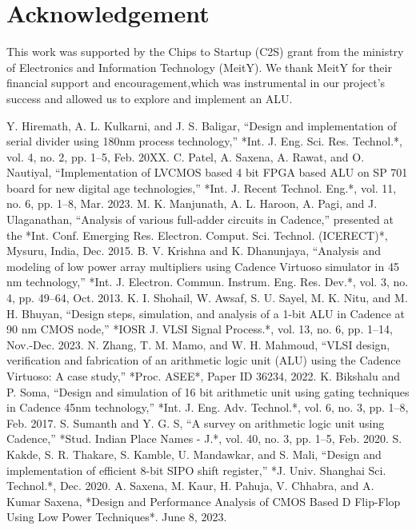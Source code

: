 \documentclass[conference]{IEEEtran}
\begin{document}
\section*{Acknowledgement}
This work was supported by the Chips to Startup (C2S) grant from the ministry of Electronics and Information Technology (MeitY). We thank MeitY for their financial support and encouragement,which was instrumental in our project’s success and allowed us to explore and implement an ALU.
\\

\begin{thebibliography}{00}
Y. Hiremath, A. L. Kulkarni, and J. S. Baligar, “Design and implementation of serial divider using 180nm process technology,” *Int. J. Eng. Sci. Res. Technol.*, vol. 4, no. 2, pp. 1–5, Feb. 20XX.
C. Patel, A. Saxena, A. Rawat, and O. Nautiyal, “Implementation of LVCMOS based 4 bit FPGA based ALU on SP 701 board for new digital age technologies,” *Int. J. Recent Technol. Eng.*, vol. 11, no. 6, pp. 1–8, Mar. 2023.
 M. K. Manjunath, A. L. Haroon, A. Pagi, and J. Ulaganathan, “Analysis of various full-adder circuits in Cadence,” presented at the *Int. Conf. Emerging Res. Electron. Comput. Sci. Technol. (ICERECT)*, Mysuru, India, Dec. 2015.
B. V. Krishna and K. Dhanunjaya, “Analysis and modeling of low power array multipliers using Cadence Virtuoso simulator in 45 nm technology,” *Int. J. Electron. Commun. Instrum. Eng. Res. Dev.*, vol. 3, no. 4, pp. 49–64, Oct. 2013.
 K. I. Shohail, W. Awsaf, S. U. Sayel, M. K. Nitu, and M. H. Bhuyan, “Design steps, simulation, and analysis of a 1-bit ALU in Cadence at 90 nm CMOS node,” *IOSR J. VLSI Signal Process.*, vol. 13, no. 6, pp. 1–14, Nov.-Dec. 2023.
  N. Zhang, T. M. Mamo, and W. H. Mahmoud, “VLSI design, verification and fabrication of an arithmetic logic unit (ALU) using the Cadence Virtuoso: A case study,” *Proc. ASEE*, Paper ID 36234, 2022.
 K. Bikshalu and P. Soma, “Design and simulation of 16 bit arithmetic unit using gating techniques in Cadence 45nm technology,” *Int. J. Eng. Adv. Technol.*, vol. 6, no. 3, pp. 1–8, Feb. 2017.
 S. Sumanth and Y. G. S, “A survey on arithmetic logic unit using Cadence,” *Stud. Indian Place Names - J.*, vol. 40, no. 3, pp. 1–5, Feb. 2020.
  S. Kakde, S. R. Thakare, S. Kamble, U. Mandawkar, and S. Mali, “Design and implementation of efficient 8-bit SIPO shift register,” *J. Univ. Shanghai Sci. Technol.*, Dec. 2020.
 A. Saxena, M. Kaur, H. Pahuja, V. Chhabra, and A. Kumar Saxena, *Design and Performance Analysis of CMOS Based D Flip-Flop Using Low Power Techniques*. June 8, 2023.


\end{thebibliography}
\end{document}
